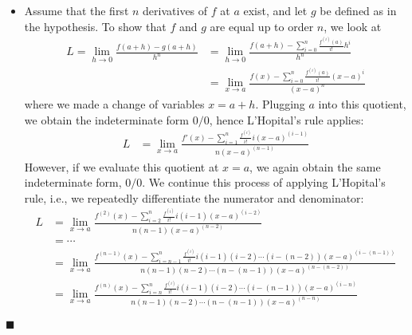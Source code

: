 \documentclass[12pt]{article}
\renewcommand{\qed}{\hfill$\blacksquare$}
\renewenvironment{proof}{\begin{addmargin}[1em]{0em}\begin{newproof}}{\end{newproof}\end{addmargin}\qed}
\begin{document}
\begin{proof}
\begin{itemize}
	\item Assume that the first $n$ derivatives of $f$ at $a$ exist, and let $g$ be defined as in the hypothesis. To show that $f$ and $g$ are equal up to order $n$, we look at
	\begin{equation*}\begin{split}
	L = \lim_{h\rightarrow 0} \frac{f\left(a+h\right)-g\left(a+h\right)}{h^n} & = \lim_{h\rightarrow 0} \frac{f\left(a+h\right) - \sum_{i=0}^n \frac{f^{\left(i\right)} \left(a\right)}{i!} h^i } {h^n} \\
	& = \lim_{x\rightarrow a} \frac{f\left(x\right) - \sum_{i=0}^n \frac{f^{\left(i\right)} \left(a\right)}{i!} \left(x-a\right)^i}{\left(x-a\right)^n}
	\end{split}\end{equation*}
where we made a change of variables $x=a+h$. Plugging $a$ into this quotient, we obtain the indeterminate form $0/0$, hence L'Hopital's rule applies:
\begin{equation*}\begin{split}
L & = \lim_{x\rightarrow a} \frac{f'\left(x\right) - \sum_{i=1}^n \frac{f^{\left(i\right)}}{i!} i\left(x-a\right)^{\left(i-1\right)}}{n \left(x-a\right)^{\left(n-1\right)}}
\end{split}\end{equation*}
However, if we evaluate this quotient at $x=a$, we again obtain the same indeterminate form, $0/0$. We continue this process of applying L'Hopital's rule, i.e., we repeatedly differentiate the numerator and denominator:
\begin{equation*}\begin{split}
L & = \lim_{x\rightarrow a} \frac{f^{\left(2\right)}\left(x\right) - \sum_{i=2}^n \frac{f^{\left(i\right)}}{i!} i\left(i-1\right) \left(x-a\right)^{\left(i-2\right)} }{n\left(n-1\right) \left(x-a\right)^{\left(n-2\right)}} \\
& = \cdots \\
& = \lim_{x\rightarrow a} \frac{f^{\left(n-1\right)}\left(x\right) - \sum_{i=n-1}^n \frac{f^{\left(i\right)}}{i!} i\left(i-1\right)\left(i-2\right) \cdots \left(i-\left(n-2\right)\right) \left(x-a\right)^{\left(i-\left(n-1\right)\right)} }{n\left(n-1\right)\left(n-2\right) \cdots \left(n-\left(n-1\right)\right) \left(x-a\right)^{\left(n-\left(n-2\right)\right)}} \\
& = \lim_{x\rightarrow a} \frac{f^{\left(n\right)}\left(x\right) - \sum_{i=n}^n \frac{f^{\left(i\right)}}{i!} i\left(i-1\right)\left(i-2\right) \cdots \left(i-\left(n-1\right)\right) \left(x-a\right)^{\left(i-n\right)} }{n\left(n-1\right)\left(n-2\right) \cdots \left(n-\left(n-1\right)\right) \left(x-a\right)^{\left(n-n\right)}}

\end{split}
\end{equation*}
\end{itemize}
\end{proof}
\end{document}
